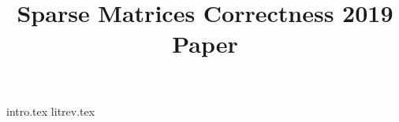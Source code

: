 \documentclass[sigconf]{acmart}
\begin{document}
\title{Sparse Matrices Correctness 2019 Paper}
\maketitle

{intro.tex}
{litrev.tex}



\end{document}
